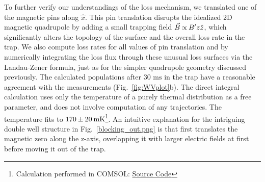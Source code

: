 To further verify our understandings of the loss mechanism, we translated one of the magnetic pins along $\hat{x}$.
This pin translation disrupts the idealized 2D magnetic quadrupole by adding a small trapping field $\vec{B} {\nobreak\hspace{.2em}} {\propto}{\nobreak\hspace{.2em}}  B^\prime z\hat{z}$, which significantly alters the topology of the \epb{} surface and the overall loss rate in the trap. We also compute loss rates for all values of pin translation and \bcl{} by numerically integrating the loss flux through these unusual loss surfaces via the Landau-Zener formula, just as for the simpler quadrupole geometry discussed previously.  The calculated populations after $30\text{ ms}$ in the trap have a reasonable agreement with the measurements (Fig.~\ref{fig:WVplot}b).
The direct integral calculation uses only the temperature of a purely thermal distribution as a free parameter, and does not involve computation of any trajectories.
The temperature fits to $170{\nobreak\hspace{.2em}} {\pm}{\nobreak\hspace{.2em}} 20{\nobreak\hspace{.2em}}\text{mK}$\s\footnote{Calculation performed in COMSOL: \href{https://github.com/dreens/spin-flip-integration/}{Source Code}}.
An intuitive explanation for the intriguing double well structure in Fig.~\ref{blocking_out.png} is that \bcl{} first translates the magnetic zero along the z-axis, overlapping it with larger electric fields at first before moving it out of the trap.



